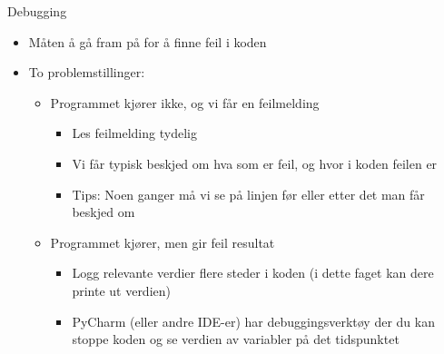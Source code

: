 \documentclass[screen, aspectratio=169]{beamer}
\begin{document}
\begin{frame}{Debugging}
	\begin{itemize}
		\item Måten å gå fram på for å finne feil i koden
		\item To problemstillinger:
		\begin{itemize}
			\item Programmet kjører ikke, og vi får en feilmelding
			\begin{itemize}
				\item Les feilmelding tydelig
				\item Vi får typisk beskjed om hva som er feil, og hvor i koden feilen er
				\item Tips: Noen ganger må vi se på linjen før eller etter det man får beskjed om
			\end{itemize}
			\item Programmet kjører, men gir feil resultat
			\begin{itemize}
				\item Logg relevante verdier flere steder i koden (i dette faget kan dere printe ut verdien)
				\item PyCharm (eller andre IDE-er) har debuggingsverktøy der du kan stoppe koden og se verdien av variabler på det tidspunktet
			\end{itemize}
		\end{itemize}
	\end{itemize}
\end{frame}
\end{document}

